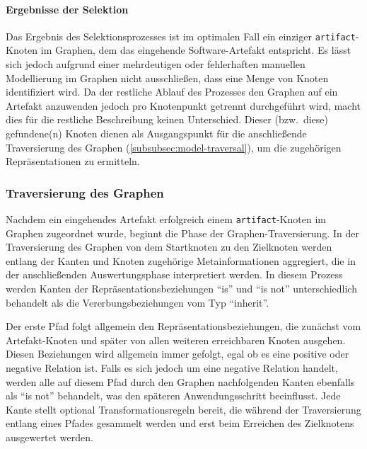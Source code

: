 \paragraph{Ergebnisse der Selektion}

Das Ergebnis des Selektionsprozesses ist im optimalen Fall ein einziger \texttt{artifact}-Knoten im Graphen, dem das eingehende Software-Artefakt entspricht.
Es lässt sich jedoch aufgrund einer mehrdeutigen oder fehlerhaften manuellen Modellierung im Graphen nicht ausschließen, dass eine Menge von Knoten identifiziert wird.
Da der restliche Ablauf des Prozesses den Graphen auf ein Artefakt anzuwenden jedoch pro Knotenpunkt getrennt durchgeführt wird, macht dies für die restliche Beschreibung keinen Unterschied.
Dieser (bzw.\ diese) gefundene(n) Knoten dienen als Ausgangspunkt für die anschließende Traversierung des Graphen (\autoref{subsubsec:model-traversal}), um die zugehörigen Repräsentationen zu ermitteln.

\subsubsection{Traversierung des Graphen}\label{subsubsec:model-traversal}

Nachdem ein eingehendes Artefakt erfolgreich einem \texttt{artifact}-Knoten im Graphen zugeordnet wurde, beginnt die Phase der Graphen-Traversierung.
In der Traversierung des Graphen von dem Startknoten zu den Zielknoten werden entlang der Kanten und Knoten zugehörige Metainformationen aggregiert, die in der anschließenden Auswertungsphase interpretiert werden.
In diesem Prozess werden Kanten der Repräsentationsbeziehungen \enquote{is} und \enquote{is not} unterschiedlich behandelt als die Vererbungsbeziehungen vom Typ \enquote{inherit}.

Der erste Pfad folgt allgemein den Repräsentationsbeziehungen, die zunächst vom Artefakt-Knoten und später von allen weiteren erreichbaren Knoten ausgehen.
Diesen Beziehungen wird allgemein immer gefolgt, egal ob es eine positive oder negative Relation ist.
Falls es sich jedoch um eine negative Relation handelt, werden alle auf diesem Pfad durch den Graphen nachfolgenden Kanten ebenfalls als \enquote{is not} behandelt, was den späteren Anwendungsschritt beeinflusst.
Jede Kante stellt optional Transformationsregeln bereit, die während der Traversierung entlang eines Pfades gesammelt werden und erst beim Erreichen des Zielknotens ausgewertet werden.


